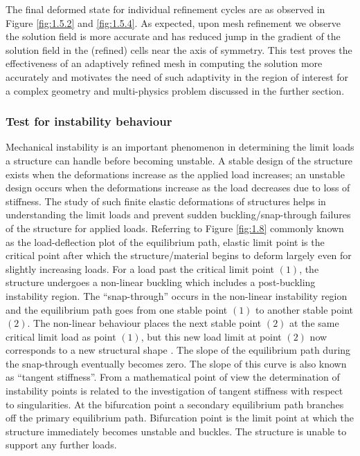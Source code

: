 The final deformed state for individual refinement cycles are as observed in Figure \eqref{fig:1.5.2} and \eqref{fig:1.5.4}. As expected, upon mesh refinement we observe the solution field is more accurate and has reduced jump in the gradient of the solution field in the (refined) cells near the axis of symmetry. This test proves the effectiveness of an adaptively refined mesh in computing the solution more accurately and motivates the need of such adaptivity in the region of interest for a complex geometry and multi-physics problem discussed in the further section.\par  

\subsubsection{Test for instability behaviour}

Mechanical instability is an important phenomenon in determining the limit loads a structure can handle before becoming unstable. A stable design of the structure exists when the deformations increase as the applied load increases; an unstable design occurs when the deformations increase as the load decreases due to loss of stiffness. The study of such finite elastic deformations of structures helps in understanding the limit loads and prevent sudden buckling/snap-through failures of the structure for applied loads. Referring to Figure \eqref{fig:1.8} commonly known as the load-deflection plot of the equilibrium path, elastic limit point is the critical point after which the structure/material begins to deform largely even for slightly increasing loads. For a load past the critical limit point $(1)$, the structure undergoes a non-linear buckling which includes a post-buckling instability region. The ``snap-through'' occurs in the non-linear instability region and the equilibrium path goes from one stable point $(1)$ to another stable point $(2)$. The non-linear behaviour places the next stable point $(2)$ at the same critical limit load as point $(1)$, but this new load limit at point $(2)$ now corresponds to a new structural shape \cite{Hrinda2010}. The slope of the equilibrium path during the snap-through eventually becomes zero. The slope of this curve is also known as ``tangent stiffness''. From a mathematical point of view the determination of instability points is related to the investigation of tangent stiffness with respect to singularities. At the bifurcation point a secondary equilibrium path branches off the primary equilibrium path. Bifurcation point is the limit point at which the structure immediately becomes unstable and buckles. The structure is unable to support any further loads. \par 

